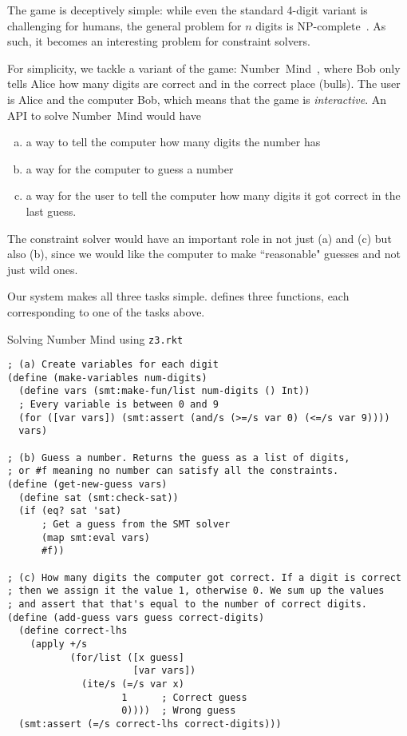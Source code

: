 The game is deceptively simple: while even the standard 4-digit variant is
challenging for humans, the general problem for $n$ digits is
NP-complete~\cite{mastermindnpc}. As such, it becomes an interesting problem for
constraint solvers.

For simplicity, we tackle a variant of the game:
Number~Mind~\cite{numbermind}, where Bob only tells Alice how many digits are
correct and in the correct place (bulls). The user is Alice and the computer
Bob, which means that the game is \textit{interactive}. An API to solve
Number~Mind would have

\begin{enumerate}[(a)]
\item a way to tell the computer how many digits the number has
\item a way for the computer to guess a number
\item a way for the user to tell the computer how many digits it got correct
  in the last guess.
\end{enumerate}

The constraint solver would have an important role in not just (a) and (c) but
also (b), since we would like the computer to make ``reasonable" guesses and
not just wild ones.

Our system makes all three tasks simple.  defines three
functions, each corresponding to one of the tasks above.

\begin{program}
\caption{Solving Number Mind using \texttt{z3.rkt}}
\label{fig:numbermind}
\begin{verbatim}
; (a) Create variables for each digit
(define (make-variables num-digits)
  (define vars (smt:make-fun/list num-digits () Int))
  ; Every variable is between 0 and 9
  (for ([var vars]) (smt:assert (and/s (>=/s var 0) (<=/s var 9))))
  vars)

; (b) Guess a number. Returns the guess as a list of digits,
; or #f meaning no number can satisfy all the constraints.
(define (get-new-guess vars)
  (define sat (smt:check-sat))
  (if (eq? sat 'sat)
      ; Get a guess from the SMT solver
      (map smt:eval vars)
      #f))

; (c) How many digits the computer got correct. If a digit is correct
; then we assign it the value 1, otherwise 0. We sum up the values
; and assert that that's equal to the number of correct digits.
(define (add-guess vars guess correct-digits)
  (define correct-lhs
    (apply +/s
           (for/list ([x guess]
                      [var vars])
             (ite/s (=/s var x)
                    1      ; Correct guess
                    0))))  ; Wrong guess
  (smt:assert (=/s correct-lhs correct-digits)))
\end{verbatim}
\end{program}
